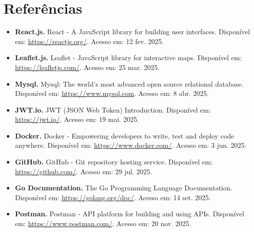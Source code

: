 \documentclass[12pt]{article}
\begin{document}
\newpage

\section*{Referências}

\begin{itemize}
    \item \textbf{React.js.} React - A JavaScript library for building user interfaces. Disponível em: \url{https://reactjs.org/}. Acesso em: 12 fev. 2025.
    \item \textbf{Leaflet.js.} Leaflet - JavaScript library for interactive maps. Disponível em: \url{https://leafletjs.com/}. Acesso em: 25 mar. 2025.
    \item \textbf{Mysql.} Mysql: The world's most advanced open source relational database. Disponível em: \url{https://www.mysql.com}. Acesso em: 8 abr. 2025.
    \item \textbf{JWT.io.} JWT (JSON Web Token) Introduction. Disponível em: \url{https://jwt.io/}. Acesso em: 19 mai. 2025.
    \item \textbf{Docker.} Docker - Empowering developers to write, test and deploy code anywhere. Disponível em: \url{https://www.docker.com/}. Acesso em: 3 jun. 2025.
    \item \textbf{GitHub.} GitHub - Git repository hosting service. Disponível em: \url{https://github.com/}. Acesso em: 29 jul. 2025.
    \item \textbf{Go Documentation.} The Go Programming Language Documentation. Disponível em: \url{https://golang.org/doc/}. Acesso em: 14 set. 2025.
    \item \textbf{Postman.} Postman - API platform for building and using APIs. Disponível em: \url{https://www.postman.com/}. Acesso em: 20 nov. 2025.
\end{itemize}
\end{document}
